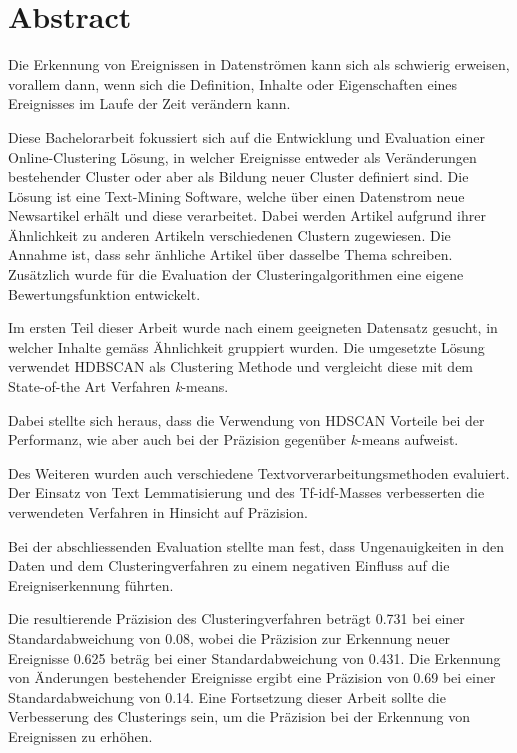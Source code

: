 
\section*{Abstract}

Die Erkennung von Ereignissen in Datenströmen kann sich als schwierig erweisen, vorallem dann,
wenn sich die Definition, Inhalte oder Eigenschaften eines Ereignisses im Laufe der Zeit verändern kann.

Diese Bachelorarbeit fokussiert sich auf die Entwicklung und Evaluation einer Online-Clustering Lösung,
in welcher Ereignisse entweder als Veränderungen bestehender Cluster oder aber als Bildung neuer Cluster
definiert sind.
Die Lösung ist eine Text-Mining Software, welche über einen Datenstrom neue Newsartikel erhält
und diese verarbeitet.
Dabei werden Artikel aufgrund ihrer Ähnlichkeit zu anderen Artikeln verschiedenen Clustern zugewiesen.
Die Annahme ist, dass sehr änhliche Artikel über dasselbe Thema schreiben.
Zusätzlich wurde für die Evaluation der Clusteringalgorithmen eine eigene Bewertungsfunktion entwickelt.

Im ersten Teil dieser Arbeit wurde nach einem geeigneten Datensatz gesucht,
in welcher Inhalte gemäss Ähnlichkeit gruppiert wurden.
Die umgesetzte Lösung verwendet HDBSCAN als Clustering Methode und vergleicht diese
mit dem State-of-the Art Verfahren \textit{k}-means.

Dabei stellte sich heraus, dass die Verwendung von HDSCAN Vorteile bei der Performanz,
wie aber auch bei der Präzision gegenüber \textit{k}-means aufweist.

Des Weiteren wurden auch verschiedene Textvorverarbeitungsmethoden evaluiert.
Der Einsatz von Text Lemmatisierung und des Tf-idf-Masses verbesserten
die verwendeten Verfahren in Hinsicht auf Präzision.

Bei der abschliessenden Evaluation stellte man fest,
dass Ungenauigkeiten in den Daten und dem Clusteringverfahren
zu einem negativen Einfluss auf die Ereigniserkennung führten.

Die resultierende Präzision des Clusteringverfahren beträgt 0.731 bei einer Standardabweichung von 0.08, 
wobei die Präzision zur Erkennung neuer Ereignisse 0.625 beträg bei einer Standardabweichung von 0.431.
Die Erkennung von Änderungen bestehender Ereignisse ergibt eine Präzision von 0.69 bei einer Standardabweichung von 0.14.
Eine Fortsetzung dieser Arbeit sollte die Verbesserung des Clusterings sein,
um die Präzision bei der Erkennung von Ereignissen zu erhöhen.

